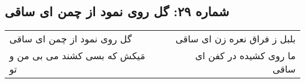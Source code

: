 \begin{center}
\section*{شماره ۲۹: گل روی نمود از چمن ای ساقی}
\label{sec:029}
\begin{longtable}{l p{0.5cm} r}
گل روی نمود از چمن ای ساقی
&&
بلبل ز فراق نعره زن ای ساقی
\\
مَیکش که بسی کشند می بی من و تو
&&
ما روی کشیده در کفن ای ساقی
\\
\end{longtable}
\end{center}
